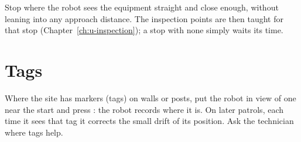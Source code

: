 \begin{tipbox}
Stop where the robot sees the equipment straight and close enough, without leaning into any
approach distance. The inspection points are then taught for that stop
(Chapter~\ref{ch:u-inspection}); a stop with none simply waits its time.
\end{tipbox}

\section{Tags}

Where the site has markers (tags) on walls or posts, put the robot in view of one near the start
and press : the robot records where it is. On later patrols, each time it sees that tag
it corrects the small drift of its position. Ask the technician where tags help.
